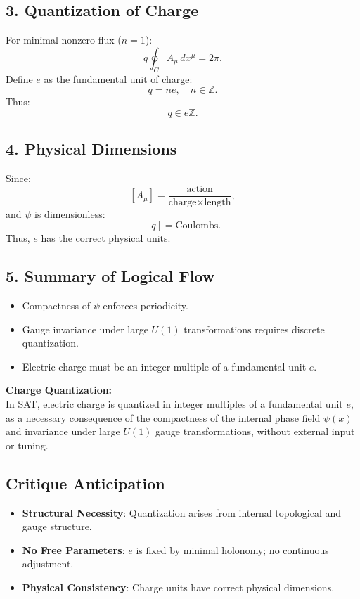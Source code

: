 \documentclass[12pt]{article}
\begin{document}
\subsection*{3. Quantization of Charge}
For minimal nonzero flux (\(n = 1\)):
\[
q \oint_C A_\mu \, dx^\mu = 2\pi.
\]
Define \(e\) as the fundamental unit of charge:
\[
q = n e, \quad n \in \mathbb{Z}.
\]
Thus:
\[
q \in e \mathbb{Z}.
\]

\subsection*{4. Physical Dimensions}
Since:
\[
[A_\mu] = \frac{\text{action}}{\text{charge} \times \text{length}},
\]
and \(\psi\) is dimensionless:
\[
[q] = \text{Coulombs}.
\]
Thus, \(e\) has the correct physical units.

\subsection*{5. Summary of Logical Flow}
\begin{itemize}
    \item Compactness of \(\psi\) enforces periodicity.
    \item Gauge invariance under large \(U(1)\) transformations requires discrete quantization.
    \item Electric charge must be an integer multiple of a fundamental unit \(e\).
\end{itemize}

\begin{mdframed}[linewidth=1pt, roundcorner=5pt, backgroundcolor=white]
\textbf{Charge Quantization:} \\
In SAT, electric charge is quantized in integer multiples of a fundamental unit \( e \), as a necessary consequence of the compactness of the internal phase field \( \psi(x) \) and invariance under large \( U(1) \) gauge transformations, without external input or tuning.
\end{mdframed}

\subsection*{Critique Anticipation}
\begin{itemize}
    \item \textbf{Structural Necessity}: Quantization arises from internal topological and gauge structure.
    \item \textbf{No Free Parameters}: \(e\) is fixed by minimal holonomy; no continuous adjustment.
    \item \textbf{Physical Consistency}: Charge units have correct physical dimensions.
\end{itemize}
\end{document}
